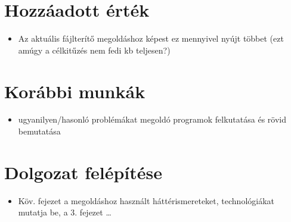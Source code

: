 \section{Hozzáadott érték}
\begin{itemize}
  \item Az aktuális fájlterítő megoldáshoz képest ez mennyivel nyújt többet (ezt amúgy a célkitűzés nem fedi kb teljesen?)
\end{itemize}
\section{Korábbi munkák}
\begin{itemize}
  \item ugyanilyen/hasonló problémákat megoldó programok felkutatása és rövid bemutatása
\end{itemize}
\section{Dolgozat felépítése}
\begin{itemize}
  \item Köv. fejezet a megoldáshoz használt háttérismereteket, technológiákat mutatja be, a 3. fejezet \ldots
\end{itemize}